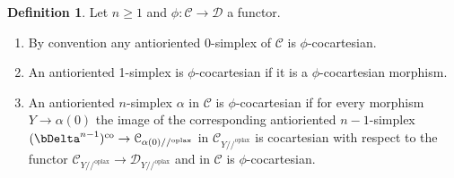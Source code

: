 \documentclass[10pt,oneside]{article}
\numberwithin{equation}{section} %
\numberwithin{figure}{section} %
\theoremstyle{plain}
\theoremstyle{definition}
\newtheorem{definition}[theorem]{Definition}
\newcommand{\mC}{{\mathcal C}}
\newcommand{\mD}{{\mathcal D}}
\newcommand{\co}{\mathrm{co}}
\newcommand{\oplax}{{\mathrm{oplax}}}
\begin{document}
\begin{definition}Let $n \geq 1$ and $\phi: \mC \to \mD$ a functor.

\begin{enumerate}[\normalfont(1)]\setlength{\itemsep}{-2pt}
\item By convention any antioriented 0-simplex of $\mC$ is $\phi$-cocartesian.
\item An antioriented 1-simplex is $\phi$-cocartesian if it is a 
$\phi$-cocartesian morphism.
\item An antioriented $n$-simplex $\alpha$ in $\mC$ is $\phi$-cocartesian if for every morphism $Y \to \alpha(0) $ the image of the corresponding antioriented $n-1$-simplex $(\bDelta^{n-1})^\co \to \mC_{\alpha(0)//^\oplax} $
in $\mC_{Y//^\oplax }$ is cocartesian with respect to the functor
$ \mC_{Y //^\oplax}  \to \mD_{Y //^\oplax}$
and in $ \mC$ is $\phi$-cocartesian.



\end{enumerate}

\end{definition}
\end{document}
